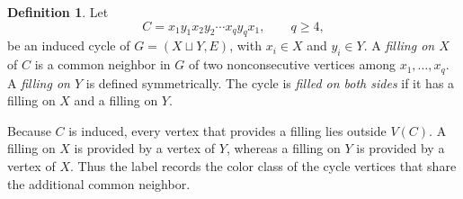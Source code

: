 \documentclass[11pt]{amsart}
\theoremstyle{definition}
\newtheorem{definition}[theorem]{Definition}
\theoremstyle{remark}
\numberwithin{equation}{section}
\begin{document}
	
	
	\begin{definition}
		Let
		\[
		C=x_1 y_1 x_2 y_2\cdots x_q y_q x_1,\qquad q\ge4,
		\]
		be an induced cycle of \(G=(X\sqcup Y,E)\), with \(x_i\in X\) and
		\(y_i\in Y\). A \emph{filling on \(X\)} of \(C\) is a common neighbor in
		\(G\) of two nonconsecutive vertices among \(x_1,\ldots,x_q\). A
		\emph{filling on \(Y\)} is defined symmetrically. The cycle is
		\emph{filled on both sides} if it has a filling on \(X\) and a filling on \(Y\).
	\end{definition}
	
	Because \(C\) is induced, every vertex that provides a filling lies outside
	\(V(C)\). A filling on \(X\) is provided by a vertex of \(Y\), whereas a
	filling on \(Y\) is provided by a vertex of \(X\). Thus the label records the
	color class of the cycle vertices that share the additional common neighbor.
	
\end{document}
